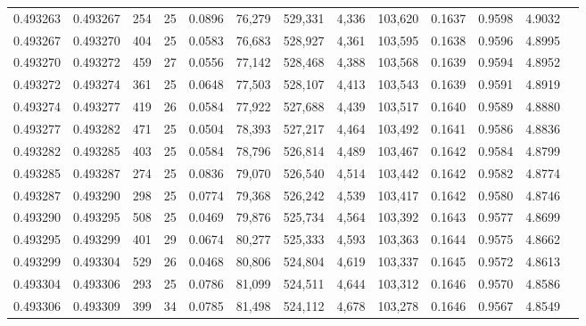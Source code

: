 \begin{tabular}{rrrrrrrrrrrrr}
0.493263 & 0.493267 & 254 &  25 &                                     0.0896 &  76,279 & 529,331 &   4,336 & 103,620 & 0.1637 & 0.9598 & 4.9032 \\
0.493267 & 0.493270 & 404 &  25 &                                     0.0583 &  76,683 & 528,927 &   4,361 & 103,595 & 0.1638 & 0.9596 & 4.8995 \\
0.493270 & 0.493272 & 459 &  27 &                                     0.0556 &  77,142 & 528,468 &   4,388 & 103,568 & 0.1639 & 0.9594 & 4.8952 \\
0.493272 & 0.493274 & 361 &  25 &                                     0.0648 &  77,503 & 528,107 &   4,413 & 103,543 & 0.1639 & 0.9591 & 4.8919 \\
0.493274 & 0.493277 & 419 &  26 &                                     0.0584 &  77,922 & 527,688 &   4,439 & 103,517 & 0.1640 & 0.9589 & 4.8880 \\
0.493277 & 0.493282 & 471 &  25 &                                     0.0504 &  78,393 & 527,217 &   4,464 & 103,492 & 0.1641 & 0.9586 & 4.8836 \\
0.493282 & 0.493285 & 403 &  25 &                                     0.0584 &  78,796 & 526,814 &   4,489 & 103,467 & 0.1642 & 0.9584 & 4.8799 \\
0.493285 & 0.493287 & 274 &  25 &                                     0.0836 &  79,070 & 526,540 &   4,514 & 103,442 & 0.1642 & 0.9582 & 4.8774 \\
0.493287 & 0.493290 & 298 &  25 &                                     0.0774 &  79,368 & 526,242 &   4,539 & 103,417 & 0.1642 & 0.9580 & 4.8746 \\
0.493290 & 0.493295 & 508 &  25 &                                     0.0469 &  79,876 & 525,734 &   4,564 & 103,392 & 0.1643 & 0.9577 & 4.8699 \\
0.493295 & 0.493299 & 401 &  29 &                                     0.0674 &  80,277 & 525,333 &   4,593 & 103,363 & 0.1644 & 0.9575 & 4.8662 \\
0.493299 & 0.493304 & 529 &  26 &                                     0.0468 &  80,806 & 524,804 &   4,619 & 103,337 & 0.1645 & 0.9572 & 4.8613 \\
0.493304 & 0.493306 & 293 &  25 &                                     0.0786 &  81,099 & 524,511 &   4,644 & 103,312 & 0.1646 & 0.9570 & 4.8586 \\
0.493306 & 0.493309 & 399 &  34 &                                     0.0785 &  81,498 & 524,112 &   4,678 & 103,278 & 0.1646 & 0.9567 & 4.8549 \\

\end{tabular}
